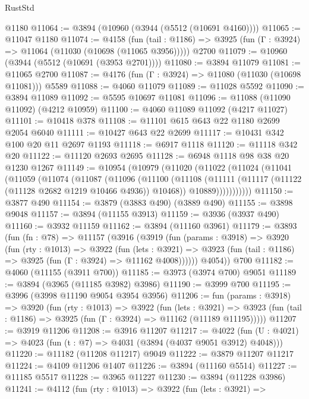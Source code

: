 \begin{lexlean}{RustStd}
\begin{coremodule}
    @1180
@11064 := @3894 (@10960 (@3944 (@5512 (@10691 @4160))))
@11065 := @11047 @1180
@11074 := @4158
    (fun (tail : @1186) => @3925 (fun (Γ : @3924) => @11064 (@11030 (@10698 (@11065 @3956)))))
    @2700
@11079 := @10960 (@3944 (@5512 (@10691 (@3953 @2701))))
@11080 := @3894 @11079
@11081 := @11065 @2700
@11087 := @4176 (fun (Γ : @3924) => @11080 (@11030 (@10698 @11081))) @5589
@11088 := @4060 @11079
@11089 := @11028 @5592
@11090 := @3894 @11089
@11092 := @5595 @10697 @11081
@11096 := @11088 (@11090 @11092) (@4212 @10959)
@11100 := @4060 @11089 @11092 (@4217 @11027)
@11101 := @10418 @378
@11108 := @11101 @615 @643 @22 @1180 @2699 @2054 @6040
@11111 := @10427 @643 @22 @2699
@11117 := @10431 @342 @100 @20 @11 @2697 @1193
@11118 := @6917 @1118
@11120 := @11118 @342 @20
@11122 := @11120 @2693 @2695
@11128 := @6948 @1118 @98 @38 @20 @1230 @1267
@11149 := @10954
    (@10979
      (@11020
        (@11022
          (@11024
            (@11041
              (@11059
                (@11074
                  (@11087
                    (@11096
                      (@11100
                        (@11108
                          (@11111 (@11117 (@11122 (@11128 @2682 @1219 @10466 @4936)) @10468))
                          @10889)))))))))))
@11150 := @3877 @490
@11154 := @3879 (@3883 @490) (@3889 @490)
@11155 := @3898 @9048
@11157 := @3894 (@11155 @3913)
@11159 := @3936 (@3937 @490)
@11160 := @3932 @11159
@11162 := @3894 (@11160 @3961)
@11179 := @3893
    (fun (fn : @78) =>
    @11157
      (@3916
        (@3919
          (fun (params : @3918) =>
          @3920
            (fun (rty : @1013) =>
            @3922
              (fun (lets : @3921) =>
              @3923 (fun (tail : @1186) => @3925 (fun (Γ : @3924) => @11162 @4008))))))
        @4054))
    @700
@11182 := @4060 (@11155 (@3911 @700))
@11185 := @3973 (@3974 @700) @9051
@11189 := @3894 (@3965 (@11185 @3982) @3986)
@11190 := @3999 @700
@11195 := @3996 (@3998 @11190 @9054 @3954 @3956)
@11206 := fun (params : @3918) =>
  @3920
    (fun (rty : @1013) =>
    @3922
      (fun (lets : @3921) =>
      @3923 (fun (tail : @1186) => @3925 (fun (Γ : @3924) => @11162 (@11189 @11195)))))
@11207 := @3919 @11206
@11208 := @3916 @11207
@11217 := @4022 (fun (U : @4021) => @4023 (fun (t : @7) => @4031 (@3894 (@4037 @9051 @3912) @4048)))
@11220 := @11182 (@11208 @11217) @9049
@11222 := @3879 @11207 @11217
@11224 := @4109 @11206 @1407
@11226 := @3894 (@11160 @5514)
@11227 := @11185 @5517
@11228 := @3965 @11227
@11230 := @3894 (@11228 @3986)
@11241 := @4112
    (fun (rty : @1013) =>
    @3922
      (fun (lets : @3921) =>

\end{coremodule}
\end{lexlean}
